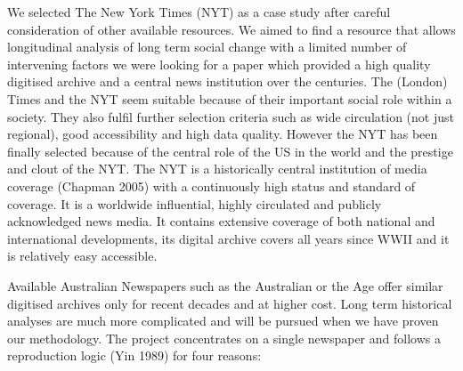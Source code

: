 We selected The New York Times (NYT) as a case study after careful consideration of other available resources. We aimed to find a resource that allows longitudinal analysis of long term social change with a limited number of intervening factors we were looking for a paper which provided a high quality digitised archive and a central news institution over the centuries. 
The (London) Times and the NYT seem suitable because of their important social role within a society. They also fulfil further selection criteria such as wide circulation (not just regional), good accessibility and high data quality. However the NYT has been finally selected because of the central role of the US in the world and the prestige and clout of the NYT. The NYT is a historically central institution of media coverage (Chapman 2005) with a continuously high status and standard of coverage. It is a worldwide influential, highly circulated and publicly acknowledged news media. It contains extensive coverage of both national and international developments, its digital archive covers all years since WWII and it is relatively easy accessible. 

Available Australian Newspapers such as the Australian or the Age offer similar digitised archives only for recent decades and at higher cost. Long term historical analyses are much more complicated and will be pursued when we have proven our methodology.
The project concentrates on a single newspaper and follows a reproduction logic (Yin 1989) for four reasons: 

